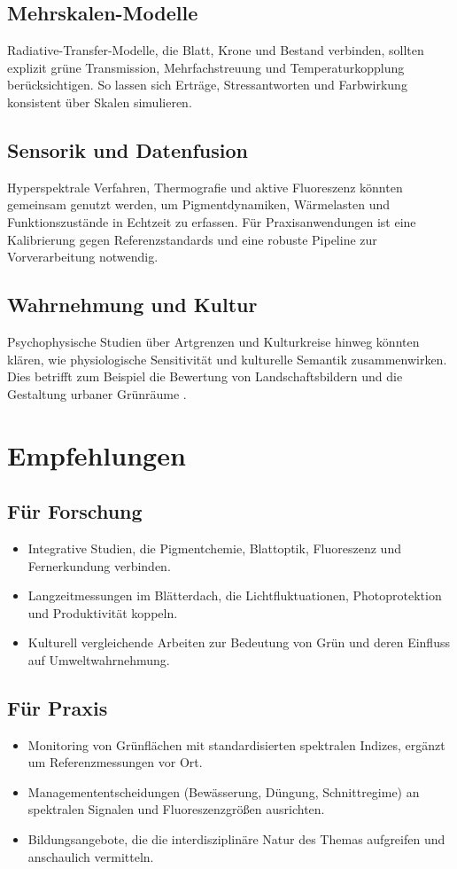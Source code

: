 \subsection{Mehrskalen-Modelle}
Radiative-Transfer-Modelle, die Blatt, Krone und Bestand verbinden, sollten explizit grüne Transmission, Mehrfachstreuung und Temperaturkopplung berücksichtigen. So lassen sich Erträge, Stressantworten und Farbwirkung konsistent über Skalen simulieren.

\subsection{Sensorik und Datenfusion}
Hyperspektrale Verfahren, Thermografie und aktive Fluoreszenz könnten gemeinsam genutzt werden, um Pigmentdynamiken, Wärmelasten und Funktionszustände in Echtzeit zu erfassen. Für Praxisanwendungen ist eine Kalibrierung gegen Referenzstandards und eine robuste Pipeline zur Vorverarbeitung notwendig.

\subsection{Wahrnehmung und Kultur}
Psychophysische Studien über Artgrenzen und Kulturkreise hinweg könnten klären, wie physiologische Sensitivität und kulturelle Semantik zusammenwirken. Dies betrifft zum Beispiel die Bewertung von Landschaftsbildern und die Gestaltung urbaner Grünräume \parencite{weber2016farbpsychologie, fischer2010farbe}.

\section{Empfehlungen}
\subsection{Für Forschung}
\begin{itemize}
  \item Integrative Studien, die Pigmentchemie, Blattoptik, Fluoreszenz und Fernerkundung verbinden.
  \item Langzeitmessungen im Blätterdach, die Lichtfluktuationen, Photoprotektion und Produktivität koppeln.
  \item Kulturell vergleichende Arbeiten zur Bedeutung von Grün und deren Einfluss auf Umweltwahrnehmung.
\end{itemize}

\subsection{Für Praxis}
\begin{itemize}
  \item Monitoring von Grünflächen mit standardisierten spektralen Indizes, ergänzt um Referenzmessungen vor Ort.
  \item Managemententscheidungen (Bewässerung, Düngung, Schnittregime) an spektralen Signalen und Fluoreszenzgrößen ausrichten.
  \item Bildungsangebote, die die interdisziplinäre Natur des Themas aufgreifen und anschaulich vermitteln.
\end{itemize}

